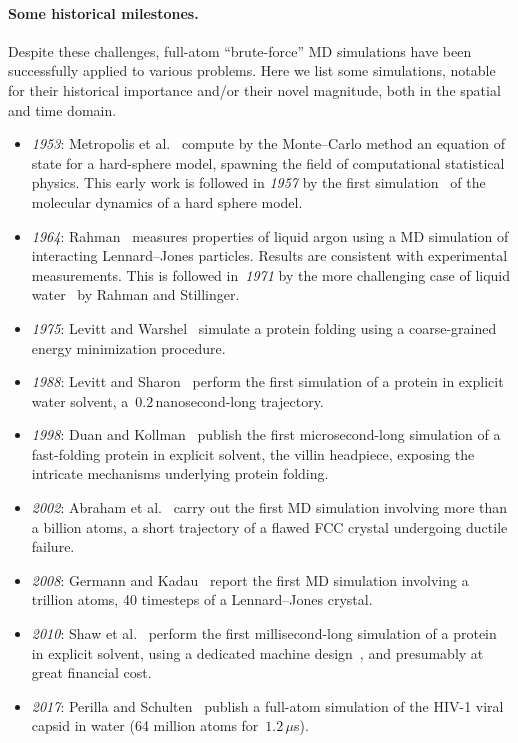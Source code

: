 \paragraph{Some historical milestones.}
\label{par:01:milestones}
Despite these challenges, full-atom ``brute-force'' MD simulations have been successfully applied to various problems. Here we list some simulations, notable for their historical importance and/or their novel magnitude, both in the spatial and time domain.
\begin{itemize}
    \item{\textit{1953}: Metropolis et al.~\cite{MRTT53} compute by the Monte--Carlo method an equation of state for a hard-sphere model, spawning the field of computational statistical physics. This early work is followed in \textit{1957} by the first simulation~\cite{AWal57} of the molecular dynamics of a hard sphere model.}
    \item{\textit{1964}: Rahman~\cite{R64} measures properties of liquid argon using a MD simulation of interacting Lennard--Jones particles. Results are consistent with experimental measurements. This is followed in~\textit{1971} by the more challenging case of liquid water~\cite{RS71} by Rahman and Stillinger.}
    \item{\textit{1975}: Levitt and Warshel~\cite{LW75} simulate a protein folding using a coarse-grained energy minimization procedure.}
    \item{\textit{1988}: Levitt and Sharon~\cite{LS88} perform the first simulation of a protein in explicit water solvent, a~$0.2$\,nanosecond-long trajectory.}
    \item{\textit{1998}: Duan and Kollman~\cite{DK98} publish the first microsecond-long simulation of a fast-folding protein in explicit solvent, the villin headpiece, exposing the intricate mechanisms underlying protein folding.}
    \item{\textit{2002}: Abraham et al.~\cite{AWGDDDLRS02} carry out the first MD simulation involving more than a billion atoms, a short trajectory of a flawed FCC crystal undergoing ductile failure.}
    \item{\textit{2008}: Germann and Kadau~\cite{GK08} report the first MD simulation involving a trillion atoms, 40 timesteps of a Lennard--Jones crystal.}
    \item{\textit{2010}: Shaw et al.~\cite{SMLLPDEBJSSal10} perform the first millisecond-long simulation of a protein in explicit solvent, using a dedicated machine design~\cite{SDDKLSYBBCal08}, and presumably at great financial cost.}
    \item{\textit{2017}: Perilla and Schulten~\cite{PS17} publish a full-atom simulation of the HIV-1 viral capsid in water (64 million atoms for~$1.2\,\mu$s).}
\end{itemize}

